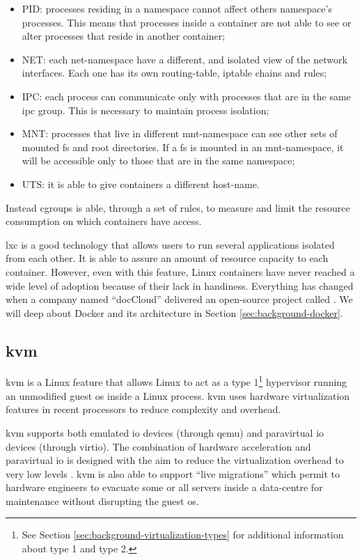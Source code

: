 \begin{itemize}
	\item{PID: processes residing in a namespace cannot affect others namespace's processes. This
		means that processes inside a container are not able to see or alter processes that reside in
		another container;}
	\item{NET: each net-namespace have a different, and isolated view of the network interfaces. Each
		one has its own routing-table, iptable chains and rules;}
	\item{IPC: each process can communicate only with processes that are in the same \ac{ipc} group. This
		is necessary to maintain process isolation;}
	\item{MNT: processes that live in different mnt-namespace can see other sets of mounted \ac{fs} and
		root directories. If a \ac{fs} is mounted in an mnt-namespace, it will be accessible only to those
		that are in the same namespace;}
	\item{UTS: it is able to give containers a different host-name.}
\end{itemize}

Instead cgroups is able, through a set of rules, to measure and limit the resource consumption on which
containers have access.

\ac{lxc} is a good technology that allows users to run several applications isolated from each other. It
is able to assure an amount of resource capacity to each container. However, even with this feature,
Linux containers have never reached a wide level of adoption because of their lack in handiness. Everything
has changed when a company named ``docCloud'' delivered an open-source project called .
We will deep about Docker and its architecture in Section \ref{sec:background-docker}.

\subsection[\acs{kvm}]{\acf{kvm}}
\label{sec:background-virtualization-kvm}
\ac{kvm} is a Linux feature that allows Linux to act as a type 1\footnote{See Section
\ref{sec:background-virtualization-types} for additional information about type 1 and type 2.} hypervisor
running an unmodified guest \acs{os} inside a Linux process. \ac{kvm} uses hardware virtualization features
in recent processors to reduce complexity and overhead.

\ac{kvm} supports both emulated \acs{io} devices (through \ac{qemu}) and paravirtual \acs{io} devices
(through virtio). The combination of hardware acceleration and paravirtual \acs{io} is designed with
the aim to reduce the virtualization overhead to very low levels \cite{mcdougall2010virtualization}.
\ac{kvm} is also able to support ``live migrations'' which permit to hardware engineers to evacuate
some or all servers inside a data-centre for maintenance without disrupting the guest \acs{os}.

